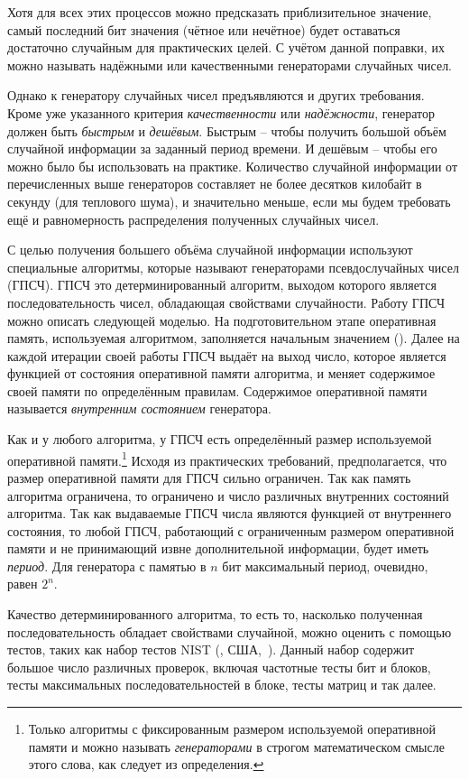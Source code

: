 Хотя для всех этих процессов можно предсказать приблизительное значение, самый последний бит значения (чётное или нечётное) будет оставаться достаточно случайным для практических целей. С учётом данной поправки, их можно называть надёжными или качественными генераторами случайных чисел.

Однако к генератору случайных чисел предъявляются и других требования. Кроме уже указанного критерия \emph{качественности} или \emph{надёжности}, генератор должен быть \emph{быстрым} и \emph{дешёвым}. Быстрым -- чтобы получить большой объём случайной информации за заданный период времени. И дешёвым -- чтобы его можно было бы использовать на практике. Количество случайной информации от перечисленных выше генераторов составляет не более десятков килобайт в секунду (для теплового шума), и значительно меньше, если мы будем требовать ещё и равномерность распределения полученных случайных чисел.

С целью получения большего объёма случайной информации используют специальные алгоритмы, которые называют генераторами псевдослучайных чисел (ГПСЧ). ГПСЧ это детерминированный алгоритм, выходом которого является последовательность чисел, обладающая свойствами случайности. Работу ГПСЧ можно описать следующей моделью. На подготовительном этапе оперативная память, используемая алгоритмом, заполняется начальным значением (). Далее на каждой итерации своей работы ГПСЧ выдаёт на выход число, которое является функцией от состояния оперативной памяти алгоритма, и меняет содержимое своей памяти по определённым правилам. Содержимое оперативной памяти называется \emph{внутренним состоянием} генератора.

Как и у любого алгоритма, у ГПСЧ есть определённый размер используемой оперативной памяти.\footnote{Только алгоритмы с фиксированным размером используемой оперативной памяти и можно называть \emph{генераторами} в строгом математическом смысле этого слова, как следует из определения.} Исходя из практических требований, предполагается, что размер оперативной памяти для ГПСЧ сильно ограничен. Так как память алгоритма ограничена, то ограничено и число различных внутренних состояний алгоритма. Так как выдаваемые ГПСЧ числа являются функцией от внутреннего состояния, то любой ГПСЧ, работающий с ограниченным размером оперативной памяти и не принимающий извне дополнительной информации, будет иметь \emph{период}. Для генератора с памятью в $n$ бит максимальный период, очевидно, равен $2^n$.

Качество детерминированного алгоритма, то есть то, насколько полученная последовательность обладает свойствами случайной, можно оценить с помощью тестов, таких как набор тестов NIST (, США,~\cite{NIST:2001}). Данный набор содержит большое число различных проверок, включая частотные тесты бит и блоков, тесты максимальных последовательностей в блоке, тесты матриц и так далее.

